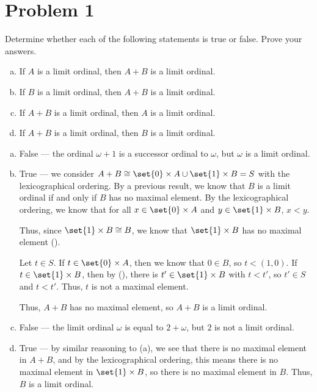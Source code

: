 \documentclass[10pt]{mypackage}
\begin{document}
\RaggedRight
\section{Problem 1}%
\begin{problem}
  Determine whether each of the following statements is true or false. Prove your answers.
  \begin{enumerate}[(a)]
    \item If $A$ is a limit ordinal, then $A+B$ is a limit ordinal.
    \item If $B$ is a limit ordinal, then $A+B$ is a limit ordinal.
    \item If $A+B$ is a limit ordinal, then $A$ is a limit ordinal.
    \item If $A+B$ is a limit ordinal, then $B$ is a limit ordinal.
  \end{enumerate}
\end{problem}
\begin{solution}\hfill
  \begin{enumerate}[(a)]
    \item False --- the ordinal $\omega + 1$ is a successor ordinal to $\omega$, but $\omega$ is a limit ordinal.
    \item True --- we consider $A+B \cong \set{0}\times A \cup \set{1}\times B = S$ with the lexicographical ordering. By a previous result, we know that $B$ is a limit ordinal if and only if $B$ has no maximal element. By the lexicographical ordering, we know that for all $x\in \set{0}\times A$ and $y\in \set{1}\times B$, $x < y$.\newline

      Thus, since $\set{1}\times B\cong B$, we know that $\set{1}\times B$ has no maximal element (\textasteriskcentered).\newline

      Let $t\in S$. If $t\in \set{0}\times A$, then we know that $0\in B$, so $t < (1,0)$. If $t\in \set{1}\times B$, then by (\textasteriskcentered), there is $t'\in \set{1}\times B$ with $t < t'$, so $t'\in S$ and $t < t'$. Thus, $t$ is not a maximal element.\newline

      Thus, $A+B$ has no maximal element, so $A+B$ is a limit ordinal.
    \item False --- the limit ordinal $\omega$ is equal to $2 + \omega$, but $2$ is not a limit ordinal.
    \item True --- by similar reasoning to (a), we see that there is no maximal element in $A + B$, and by the lexicographical ordering, this means there is no maximal element in $\set{1}\times B$, so there is no maximal element in $B$. Thus, $B$ is a limit ordinal.
  \end{enumerate}
\end{solution}
\end{document}
